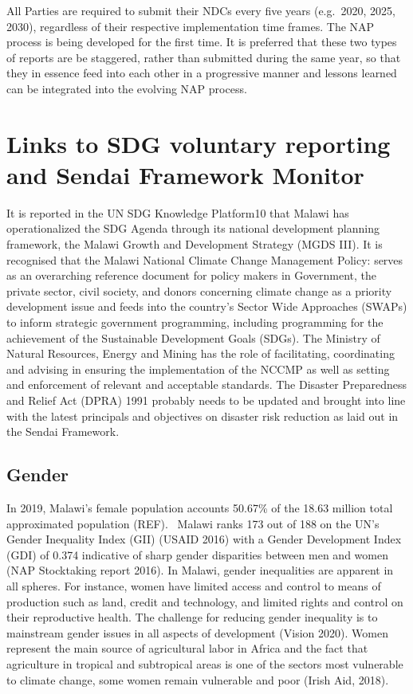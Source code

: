 \documentclass[
]{book}
\begin{document}
All Parties are required to submit their NDCs every five years (e.g.~2020, 2025, 2030), regardless of their respective implementation time frames. The NAP process
is being developed for the first time. It is preferred that these two types of reports are be staggered, rather than submitted during the same year, so that they in
essence feed into each other in a progressive manner and lessons learned can be integrated into the evolving NAP process.

\hypertarget{links-to-sdg-voluntary-reporting-and-sendai-framework-monitor}{%
\section{Links to SDG voluntary reporting and Sendai Framework Monitor}\label{links-to-sdg-voluntary-reporting-and-sendai-framework-monitor}}

It is reported in the UN SDG Knowledge Platform10 that Malawi has operationalized the SDG Agenda through its national development planning framework, the Malawi
Growth and Development Strategy (MGDS III). It is recognised that the Malawi National Climate Change Management Policy: serves as an overarching reference document
for policy makers in Government, the private sector, civil society, and donors concerning climate change as a priority development issue and feeds into the
country's Sector Wide Approaches (SWAPs) to inform strategic government programming, including programming for the achievement of the Sustainable Development Goals
(SDGs). The Ministry of Natural Resources, Energy and Mining has the role of facilitating, coordinating and advising in ensuring the implementation of the NCCMP as
well as setting and enforcement of relevant and acceptable standards. The Disaster Preparedness and Relief Act (DPRA) 1991 probably needs to be updated and brought
into line with the latest principals and objectives on disaster risk reduction as laid out in the Sendai Framework.

\hypertarget{gender}{%
\subsection{Gender}\label{gender}}

In 2019, Malawi's female population accounts 50.67\% of the 18.63 million total approximated population (REF). \, Malawi ranks 173 out of 188 on the UN's Gender
Inequality Index (GII) (USAID 2016) with a Gender Development Index (GDI) of 0.374 indicative of sharp gender disparities between men and women (NAP Stocktaking
report 2016). In Malawi, gender inequalities are apparent in all spheres. For instance, women have limited access and control to means of production such as
land, credit and technology, and limited rights and control on their reproductive health. The challenge for reducing gender inequality is to mainstream gender
issues in all aspects of development (Vision 2020). Women represent the main source of agricultural labor in Africa and the fact that agriculture in tropical and
subtropical areas is one of the sectors most vulnerable to climate change, some women remain vulnerable and poor (Irish Aid, 2018).
\end{document}
